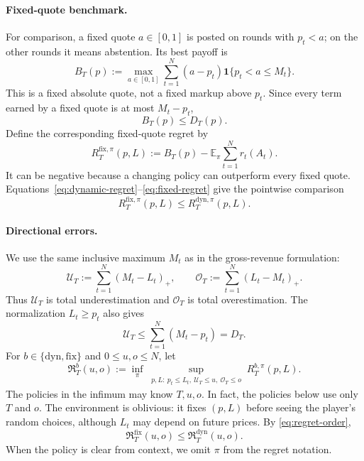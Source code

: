 \documentclass[11pt]{article}
\theoremstyle{remark}
\newcommand{\E}{\mathbb E}
\newcommand{\ind}{\mathbf 1}
\newcommand{\cU}{\mathcal U}
\newcommand{\cO}{\mathcal O}
\newcommand{\Rstar}{\mathfrak R}
\begin{document}
\paragraph{Fixed-quote benchmark.}
For comparison, a fixed quote $a\in[0,1]$ is posted on rounds with $p_t<a$;
on the other rounds it means abstention.  Its best payoff is
\begin{equation}\label{eq:benchmark}
  B_T(p):=\max_{a\in[0,1]}
     \sum_{t=1}^{N}(a-p_t)\ind\{p_t<a\le M_t\}.
\end{equation}
This is a fixed absolute quote, not a fixed markup above $p_t$.  Since every
term earned by a fixed quote is at most $M_t-p_t$,
\begin{equation}\label{eq:benchmark-dominated}
  B_T(p)\le D_T(p).
\end{equation}
Define the corresponding fixed-quote regret by
\begin{equation}\label{eq:fixed-regret}
  R_T^{\mathrm{fix},\pi}(p,L)
  :=B_T(p)-\E_\pi\sum_{t=1}^{N}r_t(A_t).
\end{equation}
It can be negative because a changing policy can outperform every fixed
quote.  Equations~\eqref{eq:dynamic-regret}--\eqref{eq:fixed-regret} give the
pointwise comparison
\begin{equation}\label{eq:regret-order}
  R_T^{\mathrm{fix},\pi}(p,L)
  \le R_T^{\mathrm{dyn},\pi}(p,L).
\end{equation}

\paragraph{Directional errors.}
We use the same inclusive maximum $M_t$ as in the gross-revenue formulation:
\begin{equation}\label{eq:errors}
  \cU_T:=\sum_{t=1}^{N}(M_t-L_t)_+,
  \qquad
  \cO_T:=\sum_{t=1}^{N}(L_t-M_t)_+.
\end{equation}
Thus $\cU_T$ is total underestimation and $\cO_T$ is total overestimation.
The normalization $L_t\ge p_t$ also gives
\begin{equation}\label{eq:under-bounded-by-dynamic}
  \cU_T\le\sum_{t=1}^{N}(M_t-p_t)=D_T.
\end{equation}
For $b\in\{\mathrm{dyn},\mathrm{fix}\}$ and $0\le u,o\le N$, let
\begin{equation}\label{eq:minimax}
  \Rstar_T^b(u,o)
  :=\inf_\pi
      \sup_{\substack{p,L:\ p_t\le L_t,\
                       \cU_T\le u,\ \cO_T\le o}}
      R_T^{b,\pi}(p,L).
\end{equation}
The policies in the infimum may know $T,u,o$.  In fact, the policies below
use only $T$ and $o$.  The environment is oblivious: it fixes $(p,L)$ before
seeing the player's random choices, although $L_t$ may depend on future
prices.  By \eqref{eq:regret-order},
\begin{equation}\label{eq:minimax-order}
  \Rstar_T^{\mathrm{fix}}(u,o)
  \le \Rstar_T^{\mathrm{dyn}}(u,o).
\end{equation}
When the policy is clear from context, we omit $\pi$ from the regret
notation.
\end{document}
